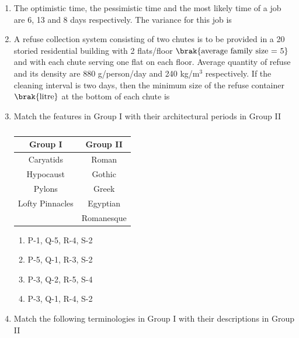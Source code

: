 \documentclass[journal,12pt,onecolumn]{IEEEtran}
\theoremstyle{remark}
\begin{document}
\begin{enumerate}
\hfill{}
    
\item The optimistic time, the pessimistic time and the most likely time of a job are 6, 13 and 8 days respectively. The variance for this job is \underline{\hspace{3cm}}

\hfill{}

\item A refuse collection system consisting of two chutes is to be provided in a 20 storied residential building with 2 flats/floor $\brak{\text{average family size = 5}}$ and with each chute serving one flat on each floor. Average quantity of refuse and its density are 880 g/person/day and 240 kg/m$^3$ respectively. If the cleaning interval is two days, then the minimum size of the refuse container $\brak{\text{litre}}$ at the bottom of each chute is \underline{\hspace{3cm}}

\hfill{}

\item Match the features in Group I with their architectural periods in Group II

\begin{table}[H]
\centering
\begin{tabular}{c|c}
Group I & Group II\\
\hline
Caryatids & Roman \\
Hypocaust & Gothic \\
Pylons & Greek \\
Lofty Pinnacles & Egyptian \\
 & Romanesque \\
\end{tabular}
\caption*{}
\label{Q.43}
\end{table}

\hfill{}
\begin{enumerate}
\item P-1, Q-5, R-4, S-2
\item P-5, Q-1, R-3, S-2
\item P-3, Q-2, R-5, S-4
\item P-3, Q-1, R-4, S-2
\end{enumerate}

\item Match the following terminologies in Group I with their descriptions in Group II


\end{enumerate}
\end{document}
